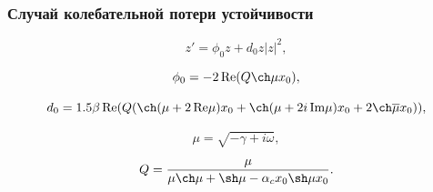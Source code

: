 \documentclass[fullscreen=true, unicode, bookmarks=false]{beamer}
\begin{document}
\begin{frame}
\frametitle{ Случай колебательной потери устойчивости }

\begin{equation}
	z' = \phi_0 z + d_0 z |z|^2,
\end{equation}

\bigskip
\pause

$$ \phi_0 = -2 \operatorname{Re} (Q\ch \mu x_0), $$

$$ d_0 = 1.5 \beta \operatorname{Re} (Q ( \ch(\mu + 2\,\mbox{Re}\mu)x_0 + \ch(\mu + 2i\,\mbox{Im}\mu)x_0 + 2\ch\overline{\mu}x_0 )), $$

\bigskip

$$ \mu = \sqrt{-\gamma + i \omega}, $$

$$ Q = \frac{\mu}{\mu \ch \mu + \sh \mu - \alpha_c x_0 \sh \mu x_0}. $$

\end{frame}
\end{document}
